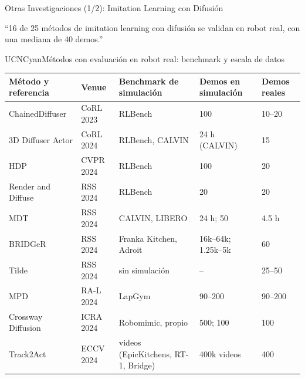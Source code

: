 \documentclass[aspectratio=169,10pt,xcolor={dvipsnames,table}]{beamer}
\newcommand{\BannerFont}{\fontsize{7.5}{9.2}\selectfont\bfseries}       %
\newcommand{\BannerArc}{1.5pt}             %
\newcommand{\BannerRule}{0.5pt}            %
\newcommand{\BannerLeftRule}{2.5pt}        %
\newcommand{\BannerCentral}[2][UCNCyan]{%
  \begin{tcolorbox}[
    enhanced,
    colback=#1!10,
    colframe=#1,
    boxrule=\BannerRule,
    leftrule=\BannerLeftRule,
    arc=\BannerArc,
    top=0.35mm, bottom=0.35mm, left=2mm, right=2mm
  ]
    {\BannerFont\raggedright\textcolor{UCNBlue}{#2}\par}
  \end{tcolorbox}%
  \vspace{-2.5mm}%
}
\newcommand{\TabFont}{\fontsize{5.3}{6.4}\selectfont}                    %
\begin{document}
\begin{frame}{Otras Investigaciones (1/2): Imitation Learning con Difusión}
  \BannerCentral[UCNCyan]{``16 de 25 métodos de imitation learning con difusión se validan en robot real, con una mediana de 40 demos.''}
  \vspace{0.8mm}
  \begin{Card}{UCNCyan}{Métodos con evaluación en robot real: benchmark y escala de datos}
    {\TabFont
    \setlength{\tabcolsep}{1.4pt}
    \renewcommand{\arraystretch}{1.0}
    \begin{tabular}{@{}L{45mm} L{17mm} L{38mm} L{25mm} L{17mm}@{}}
      \toprule
      \textbf{Método y referencia} & \textbf{Venue} & \textbf{Benchmark de simulación} & \textbf{Demos en simulación} & \textbf{Demos reales} \\
      \midrule
      ChainedDiffuser \cite{xian2023chained} & CoRL 2023 & RLBench & 100 & 10--20 \\
      3D Diffuser Actor \cite{ke2024diffuseractor} & CoRL 2024 & RLBench, CALVIN & 24 h (CALVIN) & 15 \\
      HDP \cite{ma2024hdp} & CVPR 2024 & RLBench & 100 & 20 \\
      Render and Diffuse \cite{vosylius2024render} & RSS 2024 & RLBench & 20 & 20 \\
      MDT \cite{reuss2024mdt} & RSS 2024 & CALVIN, LIBERO & 24 h; 50 & 4.5 h \\
      BRIDGeR \cite{chen2024bridger} & RSS 2024 & Franka Kitchen, Adroit & 16k--64k; 1.25k--5k & 60 \\
      Tilde \cite{si2024tilde} & RSS 2024 & sin simulación & -- & 25--50 \\
      MPD \cite{scheikl2024mpd} & RA-L 2024 & LapGym & 90--200 & 90--200 \\
      Crossway Diffusion \cite{li2024crossway} & ICRA 2024 & Robomimic, propio & 500; 100 & 100 \\
      Track2Act \cite{bharadhwaj2024track2act} & ECCV 2024 & videos (EpicKitchens, RT-1, Bridge) & 400k videos & 400 \\

\end{tabular}}
\end{Card}
\end{frame}
\end{document}
